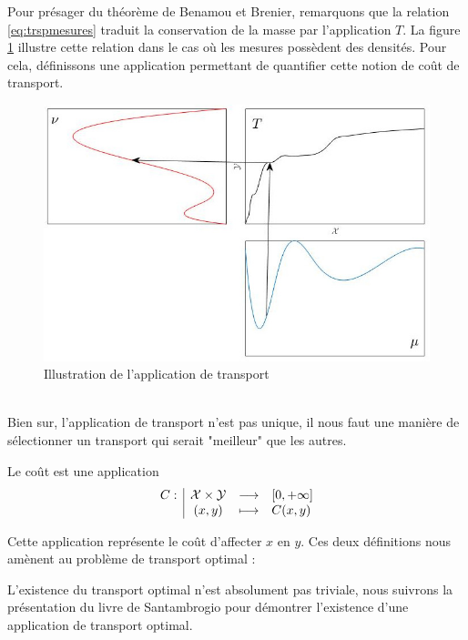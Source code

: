 \documentclass[a4paper,12pt]{article}
\begin{document}
Pour présager du théorème de Benamou et Brenier, remarquons que la relation \eqref{eq:trspmesures} traduit la conservation de la masse par l'application $T$. La figure \ref{fig:illustrans} illustre cette relation dans le cas où les mesures possèdent des densités. Pour cela, définissons une application permettant de quantifier cette notion de coût de transport. 
\begin{figure}[!h]
\centering
\includegraphics[width=0.7\linewidth]{img/transport.jpg}
\caption{\label{fig:illustrans}Illustration de l'application de transport}
\end{figure}\\
Bien sur, l'application de transport n'est pas unique, il nous faut une manière de sélectionner un transport qui serait "meilleur" que les autres. 
\newpage
\begin{definition}{}
Le coût est une application 
$$
\begin{array}[t]{l|ccl} C: & \mathcal{X}\times\mathcal{Y} & \longrightarrow & [0,+\infty] \\ & (x,y) & \longmapsto & C(x,y) \end{array}
$$
\end{definition}
Cette application représente le coût d'affecter $x$ en $y$. Ces deux définitions nous amènent au problème de transport optimal : \\

\vspace{0.3cm}

L'existence du transport optimal n'est absolument pas triviale, nous suivrons la présentation du livre de Santambrogio  \cite{santambrogio2015optimal} pour démontrer l'existence d'une application de transport optimal.
\end{document}
